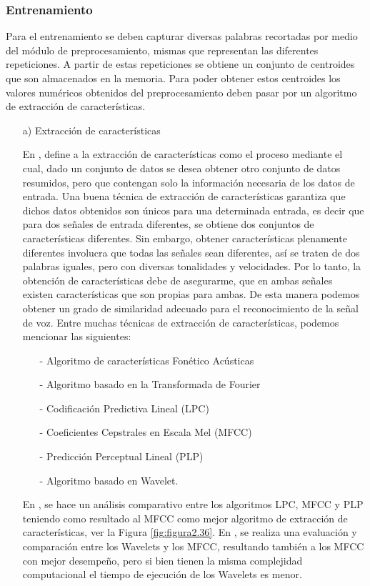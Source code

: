 \newpage
\subsubsection{Entrenamiento}
Para el entrenamiento se deben capturar diversas palabras recortadas por medio del módulo de preprocesamiento, mismas que representan las diferentes repeticiones. A partir de estas repeticiones se obtiene un conjunto de centroides que son almacenados en la memoria. Para poder obtener estos centroides los valores numéricos obtenidos del preprocesamiento deben pasar por un algoritmo de extracción de características.
\begin{enumerate}
\item[a)]Extracción de características
\par
En \cite{claudio}, define a la extracción de características como el proceso mediante el cual, dado un conjunto de datos se desea obtener otro conjunto de datos resumidos, pero que contengan solo la información necesaria de los datos de entrada. Una buena técnica de extracción de características garantiza que dichos datos obtenidos son únicos para una determinada entrada, es decir que para dos señales de entrada diferentes, se obtiene dos conjuntos de características diferentes.
\vskip 0.5cm
Sin embargo, obtener características plenamente diferentes involucra que todas las señales sean diferentes, así se traten de dos palabras iguales, pero con diversas tonalidades y velocidades. Por lo tanto, la obtención de características debe de asegurarme, que en ambas señales existen características que son propias para ambas. De esta manera podemos obtener un grado de similaridad adecuado para el reconocimiento de la señal de voz.
\vskip 0.5cm
Entre muchas técnicas de extracción de características, podemos mencionar las siguientes:
\begin{enumerate}
\item[-]Algoritmo de características Fonético Acústicas
\item[-]Algoritmo basado en la Transformada de Fourier
\item[-]Codificación Predictiva Lineal (LPC)
\item[-]Coeficientes Cepstrales en Escala Mel (MFCC)
\item[-]Predicción Perceptual Lineal (PLP)
\item[-]Algoritmo basado en Wavelet.
\end{enumerate}

En \citep{unam}, se hace un análisis comparativo entre los algoritmos LPC, MFCC y PLP teniendo como resultado al MFCC como mejor algoritmo de extracción de características, ver la Figura \ref{fig:figura2.36}. En \citep{orlando}, se realiza una evaluación y comparación entre los Wavelets y los MFCC, resultando también a los MFCC con mejor desempeño, pero si bien tienen la misma complejidad computacional el tiempo de ejecución de los Wavelets es menor.


\end{enumerate}
